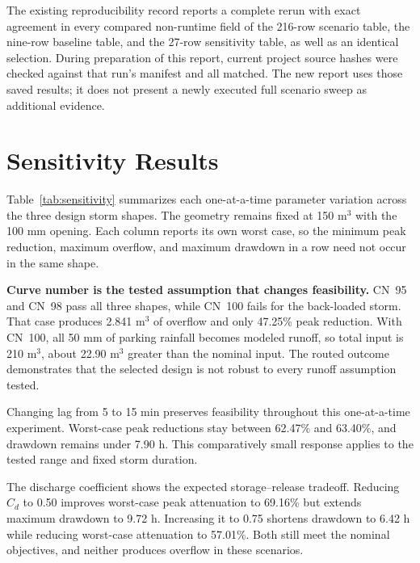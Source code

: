 \documentclass[11pt,letterpaper]{article}
\newcommand{\file}[1]{\texttt{\detokenize{#1}}}
\newcommand{\source}[1]{\par\vspace{3pt}{\footnotesize\raggedright\color{muted}Source: #1\par}}
\begin{document}
The existing reproducibility record reports a complete rerun with exact
agreement in every compared non-runtime field of the 216-row scenario table,
the nine-row baseline table, and the 27-row sensitivity table, as well as an
identical selection. During preparation of this report, current project source
hashes were checked against that run's manifest and all matched. The new
report uses those saved results; it does not present a newly executed full
scenario sweep as additional evidence.\cite{project_data}

\section{Sensitivity Results}\label{sec:sensitivity}
Table~\ref{tab:sensitivity} summarizes each one-at-a-time parameter variation
across the three design storm shapes. The geometry remains fixed at 150 m$^3$
with the 100 mm opening. Each column reports its own worst case, so the
minimum peak reduction, maximum overflow, and maximum drawdown in a row
need not occur in the same shape.

\begin{table}[H]
\centering\small
\caption{Selected-design sensitivity for the 50 mm events. Nominal parameter
values repeat intentionally in each group.}\label{tab:sensitivity}

\source{Bundled \file{source_data/sensitivity.csv}.}
\end{table}

\textbf{Curve number is the tested assumption that changes feasibility.}
CN~95 and CN~98 pass all three shapes, while CN~100 fails for the back-loaded
storm. That case produces 2.841 m$^3$ of overflow and only 47.25\% peak
reduction. With CN~100, all 50 mm of parking rainfall becomes modeled runoff,
so total input is 210 m$^3$, about 22.90 m$^3$ greater than the nominal input.
The routed outcome demonstrates that the selected design is not robust to
every runoff assumption tested.

Changing lag from 5 to 15 min preserves feasibility throughout this
one-at-a-time experiment. Worst-case peak reductions stay between 62.47\%
and 63.40\%, and drawdown remains under 7.90 h. This comparatively small
response applies to the tested range and fixed storm duration.

The discharge coefficient shows the expected storage--release tradeoff.
Reducing $C_d$ to 0.50 improves worst-case peak attenuation to 69.16\% but
extends maximum drawdown to 9.72 h. Increasing it to 0.75 shortens drawdown
to 6.42 h while reducing worst-case attenuation to 57.01\%. Both still meet
the nominal objectives, and neither produces overflow in these scenarios.
\end{document}
